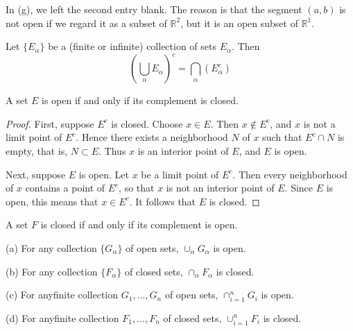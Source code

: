In (g), we left the second entry blank. The reason is that the segment $(a,b)$ is not open if we regard it as a subset of $\mathbb{R}^2$, but it is an open subset of $\mathbb{R}^1$.


\begin{thm}
    \label{thm:2.22}
    Let $\{E_\alpha\}$ be a (finite or infinite) collection of sets $E_\alpha$. Then
    \begin{equation}
        \left(\bigcup_{\alpha} E_{\alpha} \right)^c = \bigcap_{\alpha}( E_{\alpha}^c )
    \end{equation}
\end{thm}

\begin{thm}
    \label{thm:2.23}
    A set $E$ is open if and only if its complement is closed.
\end{thm}

\begin{proof}
    First, suppose $E^c$ is closed. Choose $x \in E$. Then $x \not\in E^c$, and $x$ is not a limit point of $E^c$. Hence there exists a neighborhood $N$ of $x$ such that $E^c \cap N$ is empty, that is, $N \subset E$. Thus $x$ is an interior point of $E$, and $E$ is open.
    
    Next, suppose $E$ is open. Let $x$ be a limit point of $E^c$. Then every neighborhood of $x$ contains a point of $E^c$, so that $x$ is not an interior point of $E$. Since $E$ is open, this means that $x \in E^c$. It follows that $E$ is closed.
\end{proof}

\begin{myCorollary}
    A set $F$ is closed if and only if its complement is open.
\end{myCorollary}


\begin{thm}
    \label{thm:2.24}
    (a) For any collection $\{G_\alpha\}$ of open sets,  $\cup_\alpha G_\alpha$ is open.

    (b) For any collection $\{F_\alpha\}$ of closed sets, $\cap_\alpha F_\alpha$ is closed.

    (c) For anyfinite collection $G_1, ..., G_n$ of open sets, $\cap_{i=1}^n G_i$ is open.

    (d) For anyfinite collection $F_1, ..., F_n$ of closed sets, $\cup_{i=1}^n F_i$ is closed.
\end{thm}

